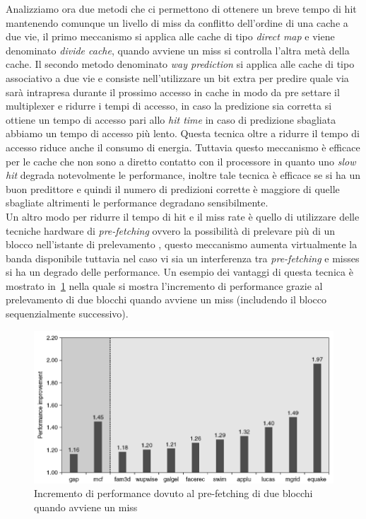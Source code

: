 Analizziamo ora due metodi che ci permettono di ottenere un breve tempo di hit mantenendo comunque un livello di miss da conflitto dell'ordine di una cache a due vie, il primo meccanismo si applica alle cache di tipo \emph{direct map} e viene denominato \emph{divide cache}, quando avviene un miss si controlla l'altra metà della cache. Il secondo metodo denominato \emph{way prediction} si applica alle cache di tipo associativo a due vie e consiste nell'utilizzare un bit extra per predire quale via sarà intrapresa durante il prossimo accesso in cache in modo da pre settare il multiplexer e ridurre i tempi di accesso, in caso la predizione sia corretta si ottiene un tempo di accesso pari allo \emph{hit time} in caso di predizione sbagliata abbiamo un tempo di accesso più lento. Questa tecnica oltre a ridurre il tempo di accesso riduce anche il consumo di energia. Tuttavia questo meccanismo è efficace per le cache che non sono a diretto contatto con il processore in quanto uno \emph{slow hit} degrada notevolmente le performance, inoltre tale tecnica è efficace se si ha un buon predittore e quindi il numero di predizioni corrette è maggiore di quelle sbagliate altrimenti le performance degradano sensibilmente.\\
Un altro modo per ridurre il tempo di hit e il miss rate è quello di utilizzare delle tecniche hardware di \emph{pre-fetching} ovvero la possibilità di prelevare più di un blocco nell'istante di prelevamento , questo meccanismo aumenta virtualmente la banda disponibile tuttavia nel caso vi sia un interferenza tra \emph{pre-fetching} e misses si ha un degrado delle performance. Un esempio dei vantaggi di questa tecnica è mostrato in \figurename\,\ref{fig:prefetchingcache} nella quale si mostra l'incremento di performance grazie al prelevamento di due blocchi quando avviene un miss (includendo il blocco sequenzialmente successivo).
\begin{figure}
\centering
\includegraphics[scale=0.5]{img/prefetchingcache.png}
\caption{Incremento di performance dovuto al pre-fetching di due blocchi quando avviene un miss}\label{fig:prefetchingcache}
\end{figure}
